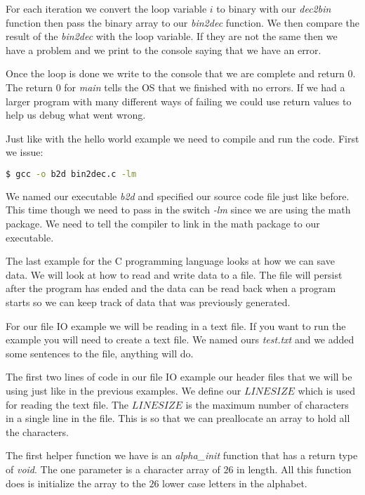 For each iteration we convert the loop variable $i$ to binary with our \emph{dec2bin} function then pass the binary array to our \emph{bin2dec} function. We then compare the result of the \emph{bin2dec} with the loop variable. If they are not the same then we have a problem and we print to the console saying that we have an error.

Once the loop is done we write to the console that we are complete and return $0$. The return $0$ for \emph{main} tells the \ac{OS} that we finished with no errors. If we had a larger program with many different ways of failing we could use return values to help us debug what went wrong. 



Just like with the hello world example we need to compile and run the code. First we issue:

\begin{lstlisting}[language=bash]
    $ gcc -o b2d bin2dec.c -lm
\end{lstlisting}

We named our executable \emph{b2d} and specified our source code file just like before. This time though we need to pass in the switch \emph{-lm} since we are using the math package. We need to tell the compiler to link in the math package to our executable.

The last example for the C programming language looks at how we can save data. We will look at how to read and write data to a file. The file will persist after the program has ended and the data can be read back when a program starts so we can keep track of data that was previously generated. 

For our file \ac{IO} example we will be reading in a text file. If you want to run the example you will need to create a text file. We named ours \emph{test.txt} and we added some sentences to the file, anything will do. 

The first two lines of code in our file \ac{IO} example our header files that we will be using just like in the previous examples. We define our $LINESIZE$ which is used for reading the text file. The $LINESIZE$ is the maximum number of characters in a single line in the file. This is so that we can preallocate an array to hold all the characters. 

The first helper function we have is an \emph{alpha\_init} function that has a return type of \emph{void}. The one parameter is a character array of $26$ in length. All this function does is initialize the array to the $26$ lower case letters in the alphabet. 

